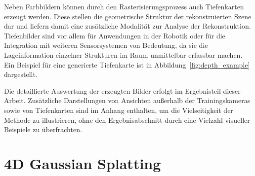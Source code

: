 Neben Farbbildern können durch den Rasterisierungsprozess auch Tiefenkarten erzeugt werden. 
Diese stellen die geometrische Struktur der rekonstruierten Szene dar und liefern damit eine zusätzliche Modalität zur Analyse der Rekonstruktion. 
Tiefenbilder sind vor allem für Anwendungen in der Robotik oder für die Integration mit weiteren Sensorsystemen von Bedeutung, da sie die Lageinformation einzelner Strukturen im Raum unmittelbar erfassbar machen. 
Ein Beispiel für eine generierte Tiefenkarte ist in Abbildung~\ref{fig:depth_example} dargestellt.

Die detaillierte Auswertung der erzeugten Bilder erfolgt im Ergebnisteil dieser Arbeit. 
Zusätzliche Darstellungen von Ansichten außerhalb der Trainingskameras sowie von Tiefenkarten sind im Anhang enthalten, um die Vielseitigkeit der Methode zu illustrieren, ohne den Ergebnisabschnitt durch eine Vielzahl visueller Beispiele zu überfrachten.


















\section{4D Gaussian Splatting}

